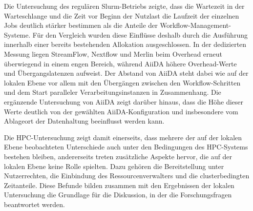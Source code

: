 Die Untersuchung des regulären Slurm-Betriebs zeigte, dass die
Wartezeit in der Warteschlange und die Zeit vor Beginn der Nutzlast
die Laufzeit der einzelnen Jobs deutlich stärker bestimmen als die
Anteile der Workflow-Management-Systeme. Für den Vergleich wurden
diese Einflüsse deshalb durch die Ausführung innerhalb einer
bereits bestehenden Allokation ausgeschlossen. In der dedizierten
Messung liegen StreamFlow, Nextflow und Merlin beim Overhead erneut
überwiegend in einem engen Bereich, während AiiDA höhere
Overhead-Werte und Übergangslatenzen aufweist. Der Abstand von
AiiDA steht dabei wie auf der lokalen Ebene vor allem mit den
Übergängen zwischen den Workflow-Schritten und dem Start paralleler
Verarbeitungsinstanzen in Zusammenhang. Die ergänzende Untersuchung
von AiiDA zeigt darüber hinaus, dass die Höhe dieser Werte deutlich
von der gewählten AiiDA-Konfiguration und insbesondere vom
Ablageort der Datenhaltung beeinflusst werden kann.

Die HPC-Untersuchung zeigt damit einerseits, dass mehrere der auf
der lokalen Ebene beobachteten Unterschiede auch unter den
Bedingungen des HPC-Systems bestehen bleiben, andererseits treten
zusätzliche Aspekte hervor, die auf der lokalen Ebene keine Rolle
spielten. Dazu gehören die Bereitstellung unter Nutzerrechten, die
Einbindung des Ressourcenverwalters und die clusterbedingten
Zeitanteile. Diese Befunde bilden zusammen mit den Ergebnissen der
lokalen Untersuchung die Grundlage für die Diskussion, in der die Forschungsfragen beantwortet werden.